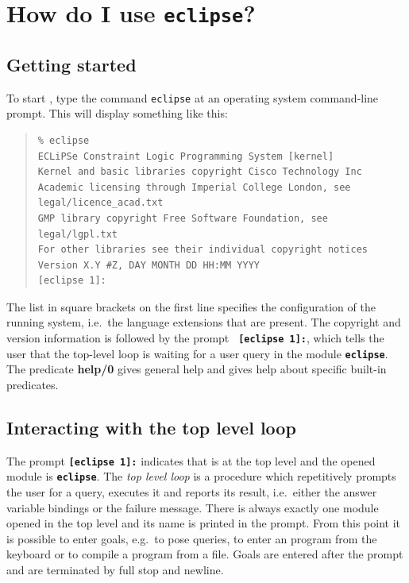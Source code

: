 \section{How do I use \texttt{eclipse}?}

\subsection{Getting started}

To start {\eclipse}, type the command \texttt{eclipse} at an
operating system command-line prompt.
This will display something like this:
\begin{quote}
\begin{verbatim}
% eclipse
ECLiPSe Constraint Logic Programming System [kernel]
Kernel and basic libraries copyright Cisco Technology Inc
Academic licensing through Imperial College London, see legal/licence_acad.txt
GMP library copyright Free Software Foundation, see legal/lgpl.txt
For other libraries see their individual copyright notices
Version X.Y #Z, DAY MONTH DD HH:MM YYYY
[eclipse 1]: 
\end{verbatim}
\end{quote}
The list in square brackets on the first line specifies the configuration
of the running system, i.e.\ the language extensions that are present.
The copyright and version information is followed by the prompt {\bf \tt
[eclipse 1]:}, which tells the user that the top-level loop is waiting
for a user query in the module {\bf \tt eclipse}.
The predicate {\bf help/0} gives
general help and  gives
help about specific built-in predicates.

\subsection{Interacting with the top level loop}

The {\eclipse} prompt {\bf \tt [eclipse 1]:} indicates that {\eclipse} 
is at the top level
and the opened module is {\bf \tt eclipse}.
The {\it top level loop} is a procedure which repetitively
prompts the user for a query, executes it and reports its
result, i.e.\ either the answer variable bindings or the
failure message.
There is always exactly one module opened in the top level
and its name is printed in the prompt.
From this point it is possible to enter {\eclipse} goals, e.g.\ to
pose queries, to enter an {\eclipse} program from the keyboard
or to compile a program from a file.
Goals are entered after the prompt and are terminated by full stop and
newline.

